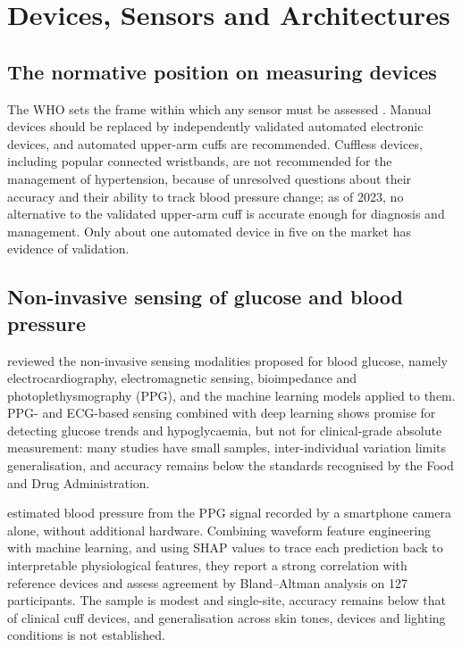 \section{Devices, Sensors and Architectures}\label{sec:lr-iot}

\subsection{The normative position on measuring devices}\label{sec:metrology}

The WHO sets the frame within which any sensor must be assessed \parencite{who2023hypertension}. Manual devices should be replaced by independently validated automated electronic devices, and automated upper-arm cuffs are recommended. Cuffless devices, including popular connected wristbands, are not recommended for the management of hypertension, because of unresolved questions about their accuracy and their ability to track blood pressure change; as of 2023, no alternative to the validated upper-arm cuff is accurate enough for diagnosis and management. Only about one automated device in five on the market has evidence of validation.

\subsection{Non-invasive sensing of glucose and blood pressure}\label{sec:cuffless}

\Textcite{alhaddad2022} reviewed the non-invasive sensing modalities proposed for blood glucose, namely electrocardiography, electromagnetic sensing, bioimpedance and photoplethysmography (PPG), and the machine learning models applied to them. PPG- and ECG-based sensing combined with deep learning shows promise for detecting glucose trends and hypoglycaemia, but not for clinical-grade absolute measurement: many studies have small samples, inter-individual variation limits generalisation, and accuracy remains below the standards recognised by the Food and Drug Administration.

\Textcite{liu2025ppg} estimated blood pressure from the PPG signal recorded by a smartphone camera alone, without additional hardware. Combining waveform feature engineering with machine learning, and using SHAP values to trace each prediction back to interpretable physiological features, they report a strong correlation with reference devices and assess agreement by Bland--Altman analysis on 127 participants. The sample is modest and single-site, accuracy remains below that of clinical cuff devices, and generalisation across skin tones, devices and lighting conditions is not established.

